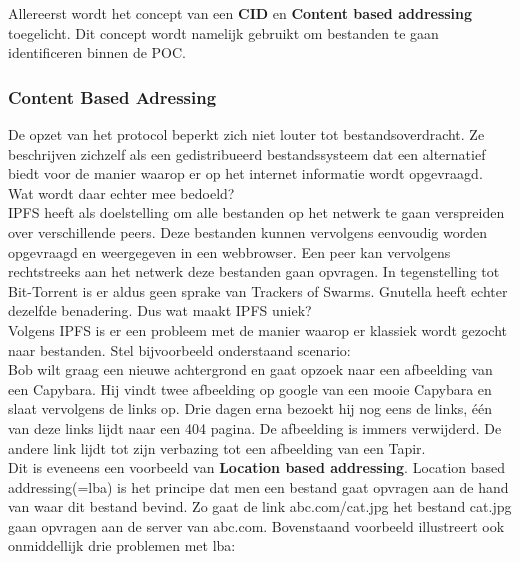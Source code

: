 Allereerst wordt het concept van een \textbf{CID} en \textbf{Content based addressing} toegelicht. Dit concept wordt namelijk gebruikt om bestanden te gaan identificeren binnen de POC. %

\subsubsection{Content Based Adressing}
\label{CBA}
 De opzet van het protocol beperkt zich niet louter tot bestandsoverdracht. Ze beschrijven zichzelf als een gedistribueerd bestandssysteem dat een alternatief biedt voor de manier waarop er op het internet informatie wordt opgevraagd. Wat wordt daar echter mee bedoeld?\\

IPFS heeft als doelstelling om alle bestanden op het netwerk te gaan verspreiden over verschillende peers. Deze bestanden kunnen vervolgens eenvoudig worden opgevraagd en weergegeven in een webbrowser. Een peer kan vervolgens rechtstreeks aan het netwerk deze bestanden gaan opvragen. In tegenstelling tot Bit-Torrent is er aldus geen sprake van Trackers of Swarms. Gnutella heeft echter dezelfde benadering. Dus wat maakt IPFS uniek?\\

Volgens IPFS is er een probleem met de manier waarop er klassiek wordt gezocht naar bestanden. Stel bijvoorbeeld onderstaand scenario:\\

Bob wilt graag een nieuwe achtergrond en gaat opzoek naar een afbeelding van een Capybara. Hij vindt twee afbeelding op google van een mooie Capybara en slaat vervolgens de links op. Drie dagen erna bezoekt hij nog eens de links, één van deze links lijdt naar een 404 pagina. De afbeelding is immers verwijderd. De andere link lijdt tot zijn verbazing tot een afbeelding van een Tapir.\\

Dit is eveneens een voorbeeld van \textbf{Location based addressing}. Location based addressing(=lba) is het principe dat men een bestand gaat opvragen aan de hand van waar dit bestand bevind. Zo gaat de link abc.com/cat.jpg het bestand cat.jpg gaan opvragen aan de server van abc.com. Bovenstaand voorbeeld illustreert ook onmiddellijk drie problemen met lba:

